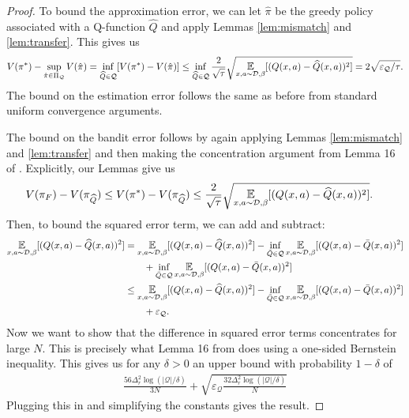 \begin{proof}
To bound the approximation error, we can let $ \hat \pi $ be the greedy policy associated with a Q-function $ \widehat Q$ and apply Lemmas \ref{lem:mismatch} and \ref{lem:transfer}. This gives us
\begin{align}
        V(\pi^*) - \sup_{\hat \pi\in \Pi_{\mathcal{Q}}}V(\hat \pi) =  \inf_{\widehat Q\in \mathcal{Q}} [V(\pi^*) - V(\hat \pi)] \leq \inf_{\widehat Q\in \mathcal{Q}} \frac{2}{\sqrt{\tau}}\sqrt{\E_{x,a\sim \mathcal{D}, \beta}[(Q(x,a) - \widehat Q(x,a))^2]} = 2 \sqrt{\varepsilon_\mathcal{Q} / \tau}.
\end{align}
The bound on the estimation error follows the same as before from standard uniform convergence arguments.

The bound on the bandit error follows by again applying Lemmas \ref{lem:mismatch} and \ref{lem:transfer} and then making the concentration argument from Lemma 16 of \cite{chen2019information}. Explicitly, our Lemmas give us
\begin{align}
    V(\pi_F) - V(\pi_{\widehat Q}) \leq V(\pi^*) - V(\pi_{\widehat Q}) &\leq \frac{2}{\sqrt{\tau}} \sqrt{\E_{x,a\sim \mathcal{D}, \beta}[(Q(x,a) - \widehat Q(x,a))^2]}.
\end{align}
Then, to bound the squared error term, we can add and subtract:
\begin{align}
    \E_{x,a\sim \mathcal{D}, \beta}[(Q(x,a) - \widehat Q(x,a))^2] &= \E_{x,a\sim \mathcal{D}, \beta}[(Q(x,a) - \widehat Q(x,a))^2] - \inf_{\bar Q \in \mathcal{Q}}\E_{x,a\sim \mathcal{D}, \beta}[(Q(x,a) - \bar Q(x,a))^2] \\ &\qquad+ \inf_{\bar Q \in \mathcal{Q}}\E_{x,a\sim \mathcal{D}, \beta}[(Q(x,a) - \bar Q(x,a))^2]\\
    &\leq \E_{x,a\sim \mathcal{D}, \beta}[(Q(x,a) - \widehat Q(x,a))^2] - \inf_{\bar Q \in \mathcal{Q}}\E_{x,a\sim \mathcal{D}, \beta}[(Q(x,a) - \bar Q(x,a))^2] \\&\qquad+ \varepsilon_\mathcal{Q}.
\end{align}
Now we want to show that the difference in squared error terms concentrates for large $ N$. This is precisely what Lemma 16 from \cite{chen2019information} does using a one-sided Bernstein inequality. This gives us for any $ \delta > 0$ an upper bound with probability $ 1-\delta$ of
\begin{align}
    \frac{56\Delta_r^2 \log(|\mathcal{Q}|/\delta)}{3N} + \sqrt{\varepsilon_\mathcal{Q} \frac{32\Delta_r^2 \log(|\mathcal{Q}|/\delta)}{N}}
\end{align}
Plugging this in and simplifying the constants gives the result.
\end{proof}

\printendnotes
